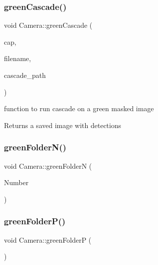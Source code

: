 \subsubsection{\texorpdfstring{green\+Cascade()}{greenCascade()}}
{\footnotesize\ttfamily void Camera\+::green\+Cascade (\begin{DoxyParamCaption}\item[{cv\+::\+Video\+Capture $\ast$}]{cap,  }\item[{std\+::string}]{filename,  }\item[{std\+::string}]{cascade\+\_\+path }\end{DoxyParamCaption})}



function to run cascade on a green masked image 

\begin{DoxyReturn}{Returns}
a saved image with detections 
\end{DoxyReturn}
\mbox{\label{classCamera_ac212835924bf4cee1b8c477a6b79f4d2}} 
\subsubsection{\texorpdfstring{green\+Folder\+N()}{greenFolderN()}}
{\footnotesize\ttfamily void Camera\+::green\+FolderN (\begin{DoxyParamCaption}\item[{int}]{Number }\end{DoxyParamCaption})}

\mbox{\label{classCamera_ac8f74b6c456d6fc7e9e83e746f8fc6c5}} 
\subsubsection{\texorpdfstring{green\+Folder\+P()}{greenFolderP()}}
{\footnotesize\ttfamily void Camera\+::green\+FolderP (\begin{DoxyParamCaption}{ }\end{DoxyParamCaption})}

\mbox{\label{classCamera_adf305e574ca94bce9435c217fef1501b}} 
